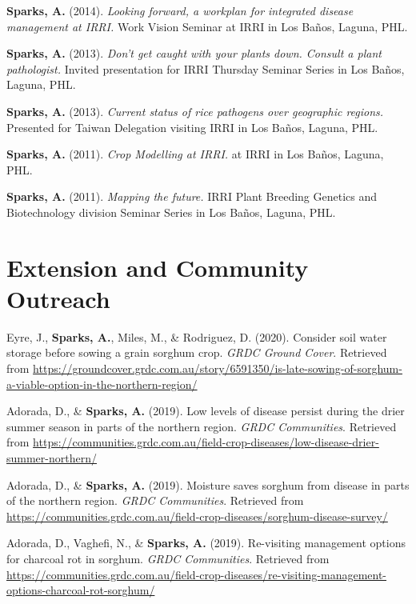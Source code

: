 \documentclass[11pt, a4paper]{awesome-cv}
\begin{document}
\textbf{Sparks, A.} (2014). \emph{Looking forward, a workplan for integrated disease management at IRRI.} Work Vision Seminar at IRRI in Los Baños, Laguna, PHL.

\textbf{Sparks, A.} (2013). \emph{Don't get caught with your plants down. Consult a plant pathologist.} Invited presentation for IRRI Thursday Seminar Series in Los Baños, Laguna, PHL.

\textbf{Sparks, A.} (2013). \emph{Current status of rice pathogens over geographic regions.} Presented for Taiwan Delegation visiting IRRI in Los Baños, Laguna, PHL.

\textbf{Sparks, A.} (2011). \emph{Crop Modelling at IRRI.} at IRRI in Los Baños, Laguna, PHL.

\textbf{Sparks, A.} (2011). \emph{Mapping the future.} IRRI Plant Breeding Genetics and Biotechnology division Seminar Series in Los Baños, Laguna, PHL.

\endgroup

\hypertarget{extension-and-community-outreach}{%
\section{Extension and Community Outreach}\label{extension-and-community-outreach}}

\begingroup
\setlength{\parindent}{-0.5in}
\setlength{\leftskip}{0.5in}

\hypertarget{refs_extension}{}
\leavevmode\hypertarget{ref-Eyre2020}{}%
Eyre, J., \textbf{Sparks, A.}, Miles, M., \& Rodriguez, D. (2020). Consider soil water storage before sowing a grain sorghum crop. \emph{GRDC Ground Cover}. Retrieved from \url{https://groundcover.grdc.com.au/story/6591350/is-late-sowing-of-sorghum-a-viable-option-in-the-northern-region/}

\leavevmode\hypertarget{ref-Adorada2019a}{}%
Adorada, D., \& \textbf{Sparks, A.} (2019). Low levels of disease persist during the drier summer season in parts of the northern region. \emph{GRDC Communities}. Retrieved from \url{https://communities.grdc.com.au/field-crop-diseases/low-disease-drier-summer-northern/}

\leavevmode\hypertarget{ref-Adorada2019b}{}%
Adorada, D., \& \textbf{Sparks, A.} (2019). Moisture saves sorghum from disease in parts of the northern region. \emph{GRDC Communities}. Retrieved from \url{https://communities.grdc.com.au/field-crop-diseases/sorghum-disease-survey/}

\leavevmode\hypertarget{ref-Adorada2019c}{}%
Adorada, D., Vaghefi, N., \& \textbf{Sparks, A.} (2019). Re-visiting management options for charcoal rot in sorghum. \emph{GRDC Communities}. Retrieved from \url{https://communities.grdc.com.au/field-crop-diseases/re-visiting-management-options-charcoal-rot-sorghum/}
\end{document}
